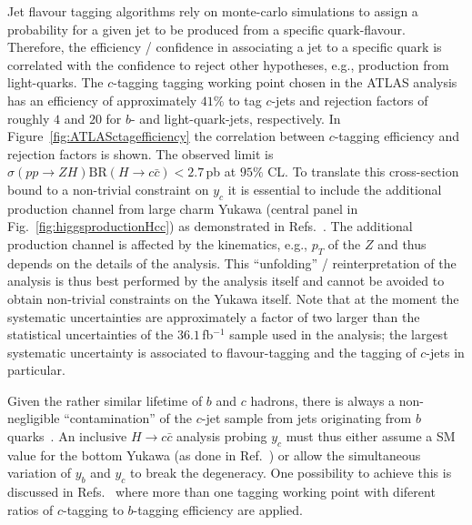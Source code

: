 \documentclass[../report.tex]{subfiles}
\begin{document}
Jet flavour tagging algorithms rely on monte-carlo simulations  to assign a probability 
for a given jet to be produced from a specific quark-flavour. 
Therefore, the efficiency / confidence in associating a jet to a specific quark is 
correlated with the confidence to reject other hypotheses, e.g., production from light-quarks.
The $c$-tagging tagging working point chosen in the ATLAS analysis \cite{Aaboud:2018fhh}  has an  efficiency of approximately $41\%$
to tag $c$-jets and rejection factors of roughly $4$ and $20$ for $b$- and light-quark-jets, respectively.
In Figure~\ref{fig:ATLASctagefficiency} 
the correlation between $c$-tagging efficiency and rejection factors is shown.
The observed limit is $\sigma(pp\to ZH)\text{BR}(H\to c\bar c)<2.7$\,pb at $95\%$ CL.
To translate this cross-section bound to a non-trivial constraint on $y_c$ it is essential 
to include the additional production channel from large charm Yukawa 
(central panel in Fig.~\ref{fig:higgsproductionHcc}) as demonstrated in Refs.~\cite{Perez:2015aoa}.
The additional production channel is affected by the kinematics, e.g., $p_T$ of the 
$Z$ and thus depends on the details of the analysis. 
This ``unfolding'' / reinterpretation of the analysis is thus best performed by 
the analysis itself and cannot be avoided to obtain non-trivial constraints on the Yukawa itself.
Note that at the moment the systematic uncertainties are approximately a factor of two
larger than the statistical uncertainties of the $36.1$\,fb$^{-1}$ sample used in the analysis;
the largest systematic uncertainty is associated to flavour-tagging and the tagging of $c$-jets in particular.

Given the rather similar lifetime of $b$ and $c$ hadrons, there is always
a non-negligible ``contamination'' of the $c$-jet sample 
from jets originating from $b$ quarks~\cite{Perez:2015aoa}.
An inclusive $H\to c\bar c$ analysis probing $y_c$ must thus either assume a SM value 
for the bottom Yukawa (as done in Ref.~\cite{Aaboud:2018fhh}) or allow the 
simultaneous variation of $y_b$ and $y_c$ to break the degeneracy.  
One possibility to achieve this is discussed  in Refs.~\cite{Perez:2015aoa,Perez:2015lra} where more than one tagging working point with diferent ratios of $c$-tagging to $b$-tagging efficiency are applied.
\end{document}
